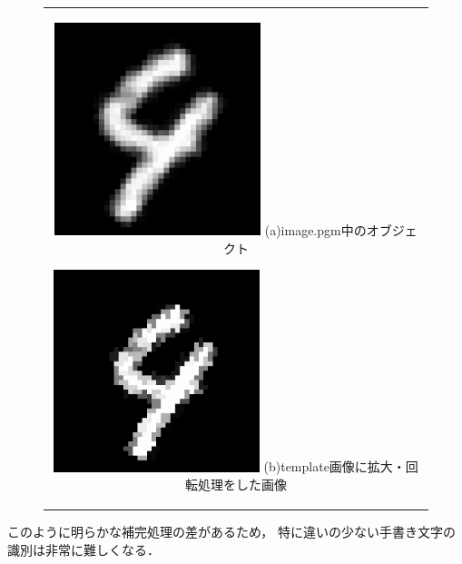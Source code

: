 \documentclass[platex,dvipdfmx]{jsarticle}
\begin{document}
\begin{figure}[htbp]
\begin{center}
  \begin{tabular}{c}

    \begin{minipage}{0.5\hsize}
      \begin{center}
        \includegraphics[clip, width=60mm]{images/naoko.png}
        \hspace{1.6cm} (a)image.pgm中のオブジェクト
      \end{center}
    \end{minipage}

    \begin{minipage}{0.5\hsize}
      \begin{center}
        \includegraphics[clip, width=60mm]{images/trimming.png}
        \hspace{1.6cm} (b)template画像に拡大・回転処理をした画像
      \end{center}
    \end{minipage}

  \end{tabular}
  \caption{}
  \label{fig:img}
  \end{center}
\end{figure}

このように明らかな補完処理の差があるため，
特に違いの少ない手書き文字の識別は非常に難しくなる．
\end{document}
